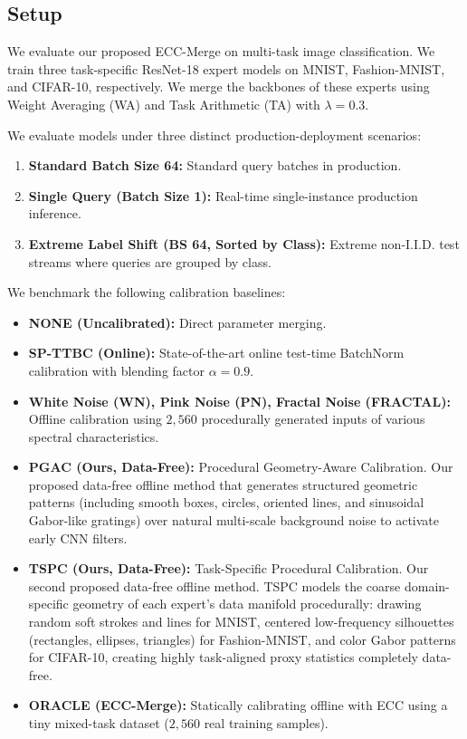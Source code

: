 \documentclass{article}
\theoremstyle{plain}
\theoremstyle{definition}
\theoremstyle{remark}
\begin{document}
\subsection{Setup}
We evaluate our proposed ECC-Merge on multi-task image classification. We train three task-specific ResNet-18 expert models on MNIST, Fashion-MNIST, and CIFAR-10, respectively. We merge the backbones of these experts using Weight Averaging (WA) and Task Arithmetic (TA) with $\lambda=0.3$. 

We evaluate models under three distinct production-deployment scenarios:
\begin{enumerate}
    \item \textbf{Standard Batch Size 64:} Standard query batches in production.
    \item \textbf{Single Query (Batch Size 1):} Real-time single-instance production inference.
    \item \textbf{Extreme Label Shift (BS 64, Sorted by Class):} Extreme non-I.I.D. test streams where queries are grouped by class.
\end{enumerate}

We benchmark the following calibration baselines:
\begin{itemize}
    \item \textbf{NONE (Uncalibrated):} Direct parameter merging.
    \item \textbf{SP-TTBC (Online):} State-of-the-art online test-time BatchNorm calibration with blending factor $\alpha=0.9$.
    \item \textbf{White Noise (WN), Pink Noise (PN), Fractal Noise (FRACTAL):} Offline calibration using $2,560$ procedurally generated inputs of various spectral characteristics.
    \item \textbf{PGAC (Ours, Data-Free):} Procedural Geometry-Aware Calibration. Our proposed data-free offline method that generates structured geometric patterns (including smooth boxes, circles, oriented lines, and sinusoidal Gabor-like gratings) over natural multi-scale background noise to activate early CNN filters.
    \item \textbf{TSPC (Ours, Data-Free):} Task-Specific Procedural Calibration. Our second proposed data-free offline method. TSPC models the coarse domain-specific geometry of each expert's data manifold procedurally: drawing random soft strokes and lines for MNIST, centered low-frequency silhouettes (rectangles, ellipses, triangles) for Fashion-MNIST, and color Gabor patterns for CIFAR-10, creating highly task-aligned proxy statistics completely data-free.
    \item \textbf{ORACLE (ECC-Merge):} Statically calibrating offline with ECC using a tiny mixed-task dataset ($2,560$ real training samples).
\end{itemize}
\end{document}

